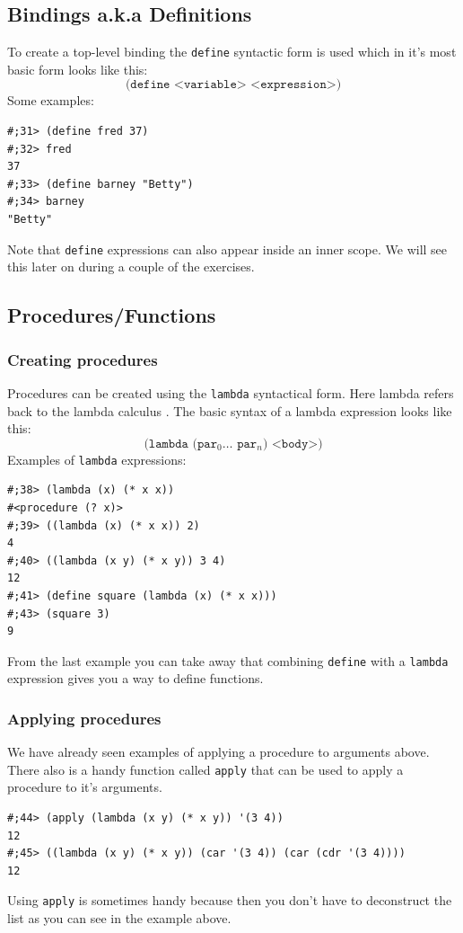 \documentclass[12pt,a4paper,english,twoside]{article}
\begin{document}
\subsection{Bindings a.k.a Definitions}
To create a top-level binding the \texttt{define} syntactic form is used which 
in it's most basic form looks like this:
\begin{equation*}
\texttt{(define <variable> <expression>)}
\end{equation*}
Some examples:
\begin{lstlisting}
#;31> (define fred 37)
#;32> fred
37
#;33> (define barney "Betty")
#;34> barney
"Betty"
\end{lstlisting}
Note that \texttt{define} expressions can also appear inside an inner scope. 
We will see this later on during a couple of the exercises.
\subsection{Procedures/Functions}
\subsubsection{Creating procedures}
Procedures can be created using the \texttt{lambda} syntactical form. Here 
lambda refers back to the lambda calculus \cite{lambda}.
The basic syntax of a lambda expression looks like this:
\begin{equation*}
\texttt{(lambda (par$_{0} \dots$ par$_{n}$) <body>)}
\end{equation*}
Examples of \texttt{lambda} expressions:
\begin{lstlisting}
#;38> (lambda (x) (* x x))
#<procedure (? x)>
#;39> ((lambda (x) (* x x)) 2)
4 
#;40> ((lambda (x y) (* x y)) 3 4)
12
#;41> (define square (lambda (x) (* x x)))
#;43> (square 3)
9
\end{lstlisting}
From the last example you can take away that combining \texttt{define} with a 
\texttt{lambda} expression gives you a way to define functions. 
\subsubsection{Applying procedures}
We have already seen examples of applying a procedure to arguments above. 
There also is a handy function called \texttt{apply} that can be used to apply 
a procedure to it's arguments.
\begin{lstlisting}
#;44> (apply (lambda (x y) (* x y)) '(3 4))
12
#;45> ((lambda (x y) (* x y)) (car '(3 4)) (car (cdr '(3 4))))
12
\end{lstlisting} Using \texttt{apply} is sometimes handy because then you 
don't have to deconstruct the list as you can see in the example above.
\end{document}
